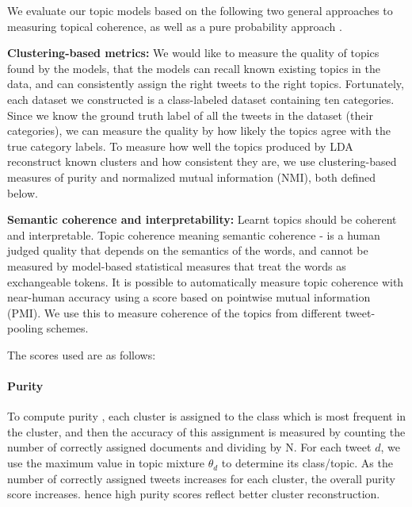 \documentclass{sig-alternate}
\begin{document}
We evaluate our topic models based on the following two general
approaches to measuring topical coherence,
as well as a pure probability approach \cite{wallach}.

{\bf Clustering-based metrics: } 
We would like to measure the quality of topics found by the models,
that the models can recall known existing topics in the
data, and can consistently assign the right tweets to the right
topics.  Fortunately, each dataset we constructed is a class-labeled
dataset containing ten categories. Since we know the ground truth
label of all the tweets in the dataset (their categories), we can
measure the quality by how likely the topics agree with the true
category labels. To measure how well the topics produced by LDA
reconstruct known clusters and how consistent they are, we use
clustering-based measures of purity and normalized mutual information
(NMI), both defined below.

{\bf Semantic coherence and interpretability:}
Learnt topics should be coherent and interpretable.  Topic coherence 
meaning semantic coherence - is a human judged quality that depends on
the semantics of the words, and cannot be measured by model-based
statistical measures that treat the words as exchangeable tokens.  It
is possible to automatically measure topic coherence with near-human
accuracy \cite{baldwin10} using a score based on pointwise mutual
information (PMI).  We use this to measure coherence of the topics
from different tweet-pooling schemes.

The scores used are as follows:

\paragraph{Purity}
To compute purity \cite{MRS08}, each cluster is assigned to the class
which is most frequent in the cluster, and then the accuracy of this
assignment is measured by counting the number of correctly assigned
documents and dividing by N. For each tweet $d$, we use the maximum
value in topic mixture $\theta_{d} $ to determine its class/topic.
As the number of correctly assigned tweets increases for each cluster,
the overall purity score increases. hence high purity scores reflect
better cluster reconstruction.
\end{document}
